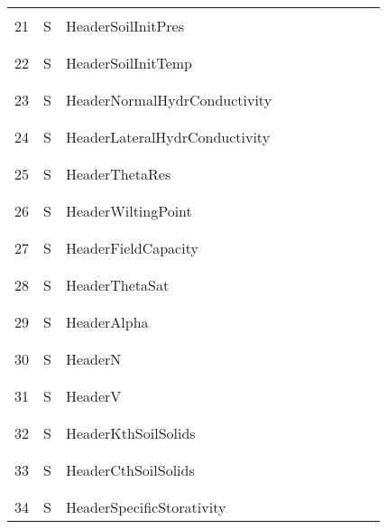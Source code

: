 \begin{longtable}{|c|c|l|c|c|c|c|p{}|c|p{}|}
&&&&&&&&&\\
21 & S & HeaderSoilInitPres & & & & & & & \\
&&&&&&&&&\\\hline%
&&&&&&&&&\\
22 & S & HeaderSoilInitTemp & & & & & & & \\
&&&&&&&&&\\\hline%
&&&&&&&&&\\
23 & S & HeaderNormalHydrConductivity & & & & & & & \\
&&&&&&&&&\\\hline%
&&&&&&&&&\\
24 & S & HeaderLateralHydrConductivity & & & & & & & \\
&&&&&&&&&\\\hline%
&&&&&&&&&\\
25 & S & HeaderThetaRes & & & & & & & \\
&&&&&&&&&\\\hline%
&&&&&&&&&\\
26 & S & HeaderWiltingPoint & & & & & & & \\
&&&&&&&&&\\\hline%
&&&&&&&&&\\
27 & S & HeaderFieldCapacity & & & & & & & \\
&&&&&&&&&\\\hline%
&&&&&&&&&\\
28 & S & HeaderThetaSat & & & & & & & \\
&&&&&&&&&\\\hline%
&&&&&&&&&\\
29 & S & HeaderAlpha & & & & & & & \\
&&&&&&&&&\\\hline%
&&&&&&&&&\\
30 & S & HeaderN & & & & & & & \\
&&&&&&&&&\\\hline%
&&&&&&&&&\\
31 & S & HeaderV & & & & & & & \\
&&&&&&&&&\\\hline%
&&&&&&&&&\\
32 & S & HeaderKthSoilSolids & & & & & & & \\
&&&&&&&&&\\\hline%
&&&&&&&&&\\
33 & S & HeaderCthSoilSolids & & & & & & & \\
&&&&&&&&&\\\hline%
&&&&&&&&&\\
34 & S & HeaderSpecificStorativity & & & & & & & \\

\end{longtable}
